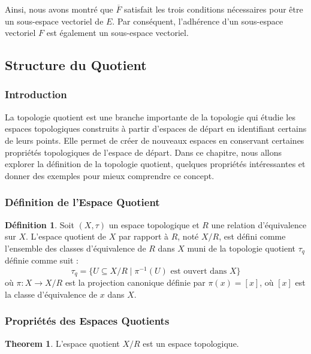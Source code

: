 \documentclass{article}
\theoremstyle{definition}
\newtheorem{definition}{Définition}[section]
\newtheorem{theorem}{Theorem}[section]
\theoremstyle{plain}
\begin{document}
Ainsi, nous avons montré que $\overline{F}$ satisfait les trois conditions nécessaires pour être un sous-espace vectoriel de $E$. Par conséquent, l'adhérence d'un sous-espace vectoriel $F$ est également un sous-espace vectoriel.

\subsection{Structure du Quotient}

\subsubsection{Introduction}

La topologie quotient est une branche importante de la topologie qui étudie les espaces topologiques construits à partir d'espaces de départ en identifiant certains de leurs points. Elle permet de créer de nouveaux espaces en conservant certaines propriétés topologiques de l'espace de départ. Dans ce chapitre, nous allons explorer la définition de la topologie quotient, quelques propriétés intéressantes et donner des exemples pour mieux comprendre ce concept.

\subsubsection{Définition de l'Espace Quotient}

\begin{definition}
Soit $(X, \tau)$ un espace topologique et $R$ une relation d'équivalence sur $X$. L'espace quotient de $X$ par rapport à $R$, noté $X/R$, est défini comme l'ensemble des classes d'équivalence de $R$ dans $X$ muni de la topologie quotient $\tau_q$ définie comme suit :
\[
\tau_q = \{ U \subseteq X/R \mid \pi^{-1}(U) \text{ est ouvert dans } X \}
\]
où $\pi : X \rightarrow X/R$ est la projection canonique définie par $\pi(x) = [x]$, où $[x]$ est la classe d'équivalence de $x$ dans $X$.
\end{definition}

\subsubsection{Propriétés des Espaces Quotients}

\begin{theorem}
L'espace quotient $X/R$ est un espace topologique.
\end{theorem}
\end{document}
